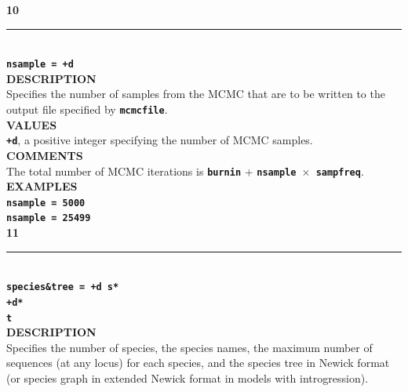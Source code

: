 \documentclass[a4paper]{book}
\numberwithin{equation}{section} \renewcommand{\baselinestretch}{0.55}
\begin{document}
\textbf{{\large 10}} \\
\noindent\rule{\textwidth}{0.8pt} \\
\textbf{{\Large \texttt{nsample = +d}}} \vspace{5pt}\\
\textbf{DESCRIPTION} \vspace{5pt}\\
Specifies the number of samples from the MCMC that are to be written to the output file specified by \textbf{\texttt{mcmcfile}}. \vspace{5pt}\\
\textbf{VALUES} \vspace{5pt}\\
\textbf{\texttt{+d}}, a positive integer specifying the number of MCMC samples. \vspace{5pt}\\
\textbf{COMMENTS} \vspace{5pt}\\
The total number of MCMC iterations is \textbf{\texttt{burnin}} + \textbf{\texttt{nsample $\times$ sampfreq}}. \vspace{5pt}\\
\textbf{EXAMPLES} \vspace{5pt}\\
\textbf{\texttt{nsample = 5000}} \vspace{5pt}\\
\textbf{\texttt{nsample = 25499}}\vspace{10pt}\\
\textbf{{\large 11}} \\
\noindent\rule{\textwidth}{0.8pt} \\
\textbf{{\Large \texttt{species\&tree = +d s*}}} \vspace{2pt}\\
\hspace*{9.2pc} \textbf{{\Large \texttt{+d*}}} \vspace{2pt}\\
\hspace*{9.2pc} \textbf{{\Large \texttt{t}}} \vspace{5pt}\\
\textbf{DESCRIPTION} \vspace{5pt}\\
Specifies the number of species, the species names, the maximum number of sequences (at any locus) for each species, and the species tree in Newick format (or species graph in extended Newick format in models with introgression).\vspace{5pt}\\
\end{document}
